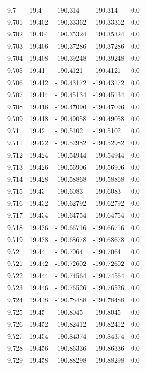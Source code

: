 \begin{tabular}{lllll}
9.7 & 19.4 & -190.314 & -190.314 & 0.0 \\
9.701 & 19.402 & -190.33362 & -190.33362 & 0.0 \\
9.702 & 19.404 & -190.35324 & -190.35324 & 0.0 \\
9.703 & 19.406 & -190.37286 & -190.37286 & 0.0 \\
9.704 & 19.408 & -190.39248 & -190.39248 & 0.0 \\
9.705 & 19.41 & -190.4121 & -190.4121 & 0.0 \\
9.706 & 19.412 & -190.43172 & -190.43172 & 0.0 \\
9.707 & 19.414 & -190.45134 & -190.45134 & 0.0 \\
9.708 & 19.416 & -190.47096 & -190.47096 & 0.0 \\
9.709 & 19.418 & -190.49058 & -190.49058 & 0.0 \\
9.71 & 19.42 & -190.5102 & -190.5102 & 0.0 \\
9.711 & 19.422 & -190.52982 & -190.52982 & 0.0 \\
9.712 & 19.424 & -190.54944 & -190.54944 & 0.0 \\
9.713 & 19.426 & -190.56906 & -190.56906 & 0.0 \\
9.714 & 19.428 & -190.58868 & -190.58868 & 0.0 \\
9.715 & 19.43 & -190.6083 & -190.6083 & 0.0 \\
9.716 & 19.432 & -190.62792 & -190.62792 & 0.0 \\
9.717 & 19.434 & -190.64754 & -190.64754 & 0.0 \\
9.718 & 19.436 & -190.66716 & -190.66716 & 0.0 \\
9.719 & 19.438 & -190.68678 & -190.68678 & 0.0 \\
9.72 & 19.44 & -190.7064 & -190.7064 & 0.0 \\
9.721 & 19.442 & -190.72602 & -190.72602 & 0.0 \\
9.722 & 19.444 & -190.74564 & -190.74564 & 0.0 \\
9.723 & 19.446 & -190.76526 & -190.76526 & 0.0 \\
9.724 & 19.448 & -190.78488 & -190.78488 & 0.0 \\
9.725 & 19.45 & -190.8045 & -190.8045 & 0.0 \\
9.726 & 19.452 & -190.82412 & -190.82412 & 0.0 \\
9.727 & 19.454 & -190.84374 & -190.84374 & 0.0 \\
9.728 & 19.456 & -190.86336 & -190.86336 & 0.0 \\
9.729 & 19.458 & -190.88298 & -190.88298 & 0.0 \\

\end{tabular}
